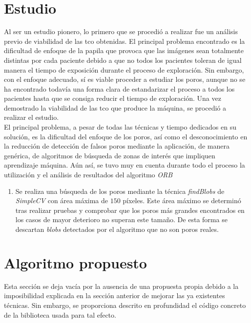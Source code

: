 \section{Estudio}
Al ser un estudio pionero, lo primero que se procedió a realizar fue
un análisis previo de viabilidad de las \gls{tco} obtenidas. El
principal problema encontrado es la dificultad de enfoque de la papila
que provoca que las imágenes sean totalmente distintas por cada
paciente debido a que no todos los pacientes toleran de igual manera
el tiempo de exposición durante el proceso de exploración. Sin
embargo, con el enfoque adecuado, sí es viable proceder a estudiar los
poros, aunque no se ha encontrado todavía una forma clara de
estandarizar el proceso a todos los pacientes hasta que se consiga
reducir el tiempo de exploración. Una vez demostrado la viabilidad de
las \gls{tco} que produce la máquina, se procedió a
realizar el estudio.\\
El principal problema, a pesar de todas las técnicas y tiempo
dedicados en su solución, es la dificultad del enfoque de los poros,
así como el desconocimiento en la reducción de detección de falsos
poros mediante la aplicación, de manera genérica, de algoritmos de
búsqueda de zonas de interés que impliquen
aprendizaje máquina. Aún así, se tuvo muy en cuenta durante todo el
proceso la utilización y el análisis de resultados del algoritmo
\emph{\gls{ORB}~\citep*{orb-bib}}
\begin{enumerate}
\item Se realiza una búsqueda de los poros mediante la técnica
  \emph{findBlobs} de \emph{SimpleCV} con área máxima de $150$
  píxeles. Este área máximo se determinó tras realizar pruebas
  y comprobar que los poros más grandes encontrados en los casos
  de mayor deterioro no superan este tamaño. De esta forma se
  descartan \emph{blobs} detectados por el algoritmo que no son 
  poros reales.
\end{enumerate}

\section{Algoritmo propuesto}
Esta sección se deja vacía por la ausencia de una propuesta propia
debido a la imposibilidad explicada en la sección anterior de mejorar
las ya existentes técnicas. Sin embargo, se proporciona descrito en
profundidad el código concreto de la biblioteca usada para tal efecto.
